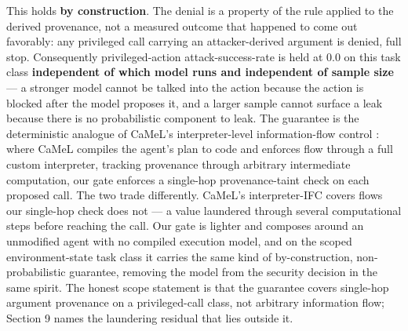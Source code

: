 \documentclass[sigconf,anonymous,review]{acmart}
\begin{document}
This holds \textbf{by construction}. The denial is a property of the rule applied to the derived provenance, not a measured outcome that happened to come out favorably: any privileged call carrying an attacker-derived argument is denied, full stop. Consequently privileged-action attack-success-rate is held at 0.0 on this task class \textbf{independent of which model runs and independent of sample size} --- a stronger model cannot be talked into the action because the action is blocked after the model proposes it, and a larger sample cannot surface a leak because there is no probabilistic component to leak. The guarantee is the deterministic analogue of CaMeL's interpreter-level information-flow control \citep{debenedetti-2025-camel}: where CaMeL compiles the agent's plan to code and enforces flow through a full custom interpreter, tracking provenance through arbitrary intermediate computation, our gate enforces a single-hop provenance-taint check on each proposed call. The two trade differently. CaMeL's interpreter-IFC covers flows our single-hop check does not --- a value laundered through several computational steps before reaching the call. Our gate is lighter and composes around an unmodified agent with no compiled execution model, and on the scoped environment-state task class it carries the same kind of by-construction, non-probabilistic guarantee, removing the model from the security decision in the same spirit. The honest scope statement is that the guarantee covers single-hop argument provenance on a privileged-call class, not arbitrary information flow; Section 9 names the laundering residual that lies outside it.
\end{document}
